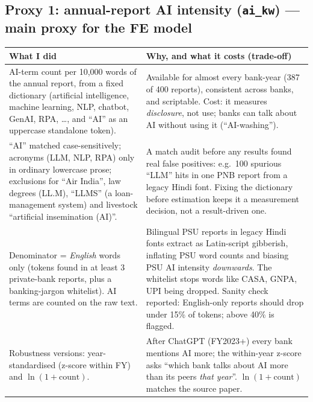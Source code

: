 \documentclass[10.5pt,a4paper]{article}
\newcommand{\var}[1]{\texttt{#1}}
\newenvironment{decisions}{%
  \begin{longtable}{L{0.36\textwidth} L{0.58\textwidth}}
  \toprule
  \textcolor{head}{\textbf{What I did}} & \textcolor{head}{\textbf{Why, and what it costs (trade-off)}}\\
  \midrule\endhead}{%
  \end{longtable}}
\newcommand{\row}[2]{#1 & #2\\ \midrule}
\begin{document}
\subsection*{Proxy 1: annual-report AI intensity (\var{ai\_kw}) --- main proxy for the FE model}
\begin{decisions}
\row{AI-term count per 10,000 words of the annual report, from a fixed dictionary (artificial intelligence, machine
learning, NLP, chatbot, GenAI, RPA, \ldots, and ``AI'' as an uppercase standalone token).}
{Available for almost every bank-year (387 of 400 reports), consistent across banks, and scriptable. Cost: it measures
\emph{disclosure}, not use; banks can talk about AI without using it (``AI-washing'').}
\row{``AI'' matched case-sensitively; acronyms (LLM, NLP, RPA) only in ordinary lowercase prose; exclusions for
``Air India'', law degrees (LL.M), ``LLMS'' (a loan-management system) and livestock ``artificial insemination (AI)''.}
{A match audit before any results found real false positives: e.g.\ 100 spurious ``LLM'' hits in one PNB report from a
legacy Hindi font. Fixing the dictionary before estimation keeps it a measurement decision, not a result-driven one.}
\row{Denominator = \emph{English} words only (tokens found in at least 3 private-bank reports, plus a banking-jargon
whitelist). AI terms are counted on the raw text.}
{Bilingual PSU reports in legacy Hindi fonts extract as Latin-script gibberish, inflating PSU word counts and biasing
PSU AI intensity \emph{downwards}. The whitelist stops words like CASA, GNPA, UPI being dropped. Sanity check reported:
English-only reports should drop under 15\% of tokens; above 40\% is flagged.}
\row{Robustness versions: year-standardised (z-score within FY) and $\ln(1+\text{count})$.}
{After ChatGPT (FY2023+) every bank mentions AI more; the within-year z-score asks ``which bank talks about AI more
than its peers \emph{that year}''. $\ln(1+\text{count})$ matches the source paper.}
\end{decisions}
\end{document}
